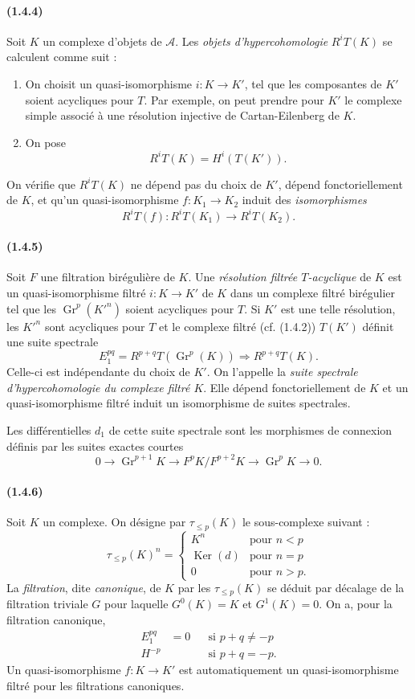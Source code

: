 \documentclass[10pt]{article}
\newcommand{\Gr}{\operatorname{Gr}}
\newcommand{\Ker}{\operatorname{Ker}}
\newcommand{\calA}{\mathcal A}
\begin{document}
\paragraph{(1.4.4)} Soit $K$ un complexe d'objets de $\calA$. Les \emph{objets d'hypercohomologie} $R^iT(K)$ se calculent comme suit :
\begin{enumerate}[label=\alph*)]
\item On choisit un quasi-isomorphisme $i:K\to K'$, tel que les composantes de $K'$ soient acycliques pour $T$. Par exemple, on peut prendre pour $K'$ le complexe simple associé à une résolution injective de Cartan-Eilenberg de $K$.
\item On pose
\[
R^iT(K)=H^i(T(K')).
\]
\end{enumerate}
On vérifie que $R^iT(K)$ ne dépend pas du choix de $K'$, dépend fonctoriellement de $K$, et qu'un quasi-isomorphisme $f:K_1\to K_2$ induit des \emph{isomorphismes}
\[
R^iT(f):R^iT(K_1)\longrightarrow R^iT(K_2).
\]

\paragraph{(1.4.5)} Soit $F$ une filtration birégulière de $K$. Une \emph{résolution filtrée $T$-acyclique} de $K$ est un quasi-isomorphisme filtré $i:K\to K'$ de $K$ dans un complexe filtré birégulier tel que les $\Gr^p(K'^n)$ soient acycliques pour $T$. Si $K'$ est une telle résolution, les $K'^n$ sont acycliques pour $T$ et le complexe filtré (cf. (1.4.2)) $T(K')$ définit une suite spectrale
\[
E_1^{pq}=R^{p+q}T(\Gr^p(K))\Rightarrow R^{p+q}T(K).
\]
Celle-ci est indépendante du choix de $K'$. On l'appelle la \emph{suite spectrale d'hypercohomologie du complexe filtré $K$}. Elle dépend fonctoriellement de $K$ et un quasi-isomorphisme filtré induit un isomorphisme de suites spectrales.

Les différentielles $d_1$ de cette suite spectrale sont les morphismes de connexion définis par les suites exactes courtes
\[
0\to\Gr^{p+1}K\to F^pK/F^{p+2}K\to\Gr^pK\to0.
\]

\paragraph{(1.4.6)} Soit $K$ un complexe. On désigne par $\tau_{\le p}(K)$ le sous-complexe suivant :
\[
\tau_{\le p}(K)^n=\begin{cases}
K^n& \text{pour }n<p\\
\Ker(d)& \text{pour }n=p\\
0& \text{pour }n>p.
\end{cases}
\]
La \emph{filtration}, dite \emph{canonique}, de $K$ par les $\tau_{\le p}(K)$ se déduit par décalage de la filtration triviale $G$ pour laquelle $G^0(K)=K$ et $G^1(K)=0$. On a, pour la filtration canonique,
\[
\begin{aligned}
E_1^{pq}&=0 &&\text{si }p+q\ne-p\\
H^{-p} &&&\text{si }p+q=-p.
\end{aligned}
\]
Un quasi-isomorphisme $f:K\to K'$ est automatiquement un quasi-isomorphisme filtré pour les filtrations canoniques.
\end{document}

